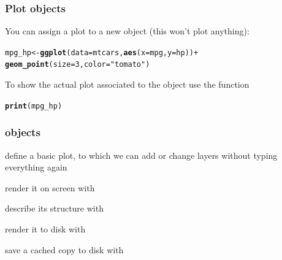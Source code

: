 \documentclass[12pt]{beamer}\usepackage[]{graphicx}\usepackage[]{color}
\makeatletter
\newcommand{\hlnum}[1]{\textcolor[rgb]{0.686,0.059,0.569}{#1}}%
\newcommand{\hlstr}[1]{\textcolor[rgb]{0.192,0.494,0.8}{#1}}%
\newcommand{\hlopt}[1]{\textcolor[rgb]{0,0,0}{#1}}%
\newcommand{\hlstd}[1]{\textcolor[rgb]{0.345,0.345,0.345}{#1}}%
\newcommand{\hlkwb}[1]{\textcolor[rgb]{0.69,0.353,0.396}{#1}}%
\newcommand{\hlkwc}[1]{\textcolor[rgb]{0.333,0.667,0.333}{#1}}%
\newcommand{\hlkwd}[1]{\textcolor[rgb]{0.737,0.353,0.396}{\textbf{#1}}}%
\newenvironment{kframe}{%
 \def\at@end@of@kframe{}%
 \ifinner\ifhmode%
  \def\at@end@of@kframe{\end{minipage}}%
  \begin{minipage}{\columnwidth}%
 \fi\fi%
 \def\FrameCommand##1{\hskip\@totalleftmargin \hskip-\fboxsep
 \colorbox{shadecolor}{##1}\hskip-\fboxsep
     \hskip-\linewidth \hskip-\@totalleftmargin \hskip\columnwidth}%
 \MakeFramed {\advance\hsize-\width
   \@totalleftmargin\z@ \linewidth\hsize
   \@setminipage}}%
 {\par\unskip\endMakeFramed%
 \at@end@of@kframe}
\newenvironment{knitrout}{}{} %
\makeatother
\begin{document}
\begin{frame}[fragile]
\frametitle{Plot objects}
You can assign a plot to a new object (this won't plot anything):
\begin{knitrout}\footnotesize
{}\color{fgcolor}\begin{kframe}
\begin{alltt}
\hlstd{mpg_hp} \hlkwb{<-} \hlkwd{ggplot}\hlstd{(}\hlkwc{data} \hlstd{= mtcars,} \hlkwd{aes}\hlstd{(}\hlkwc{x} \hlstd{= mpg,} \hlkwc{y} \hlstd{= hp))} \hlopt{+}
  \hlkwd{geom_point}\hlstd{(}\hlkwc{size} \hlstd{=} \hlnum{3}\hlstd{,} \hlkwc{color} \hlstd{=} \hlstr{"tomato"}\hlstd{)}
\end{alltt}
\end{kframe}
\end{knitrout}

To show the actual plot associated to the object  use the function 
\begin{knitrout}\footnotesize
{}\color{fgcolor}\begin{kframe}
\begin{alltt}
\hlkwd{print}\hlstd{(mpg_hp)}
\end{alltt}
\end{kframe}
\end{knitrout}
\end{frame}


\begin{frame}[fragile]
\frametitle{ objects}

\bi
  \item define a basic plot, to which we can add or change layers without typing everything again
  \item render it on screen with 
  \item describe its structure with 
  \item render it to disk with 
  \item save a cached copy to disk with 
\ei
\eb

\end{frame}

\end{document}
